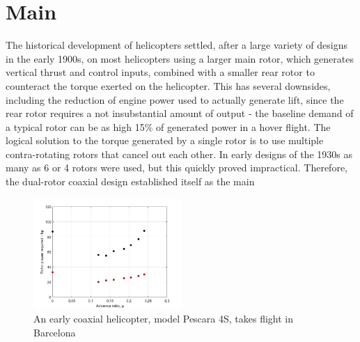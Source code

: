 \documentclass[11pt, a4paper]{scrartcl}
\begin{document}
\section{Main\label{Main}}
The historical development of helicopters settled, after a large variety of designs in the early 1900s, on most helicopters using a larger main rotor, which generates vertical thrust and control inputs, combined with a smaller rear rotor to counteract the torque exerted on the helicopter. This has several downsides, including the reduction of engine power used to actually generate lift, since the rear rotor requires a not insubstantial amount of output - the baseline demand of a typical rotor can be as high 15\% of generated power in a hover flight.\cite{dries-2003} The logical solution to the torque generated by a single rotor is to use multiple contra-rotating rotors that cancel out each other. In early designs of the 1930s as many as 6 or 4 rotors were used,\cite{Pescara-1930} but this quickly proved impractical. Therefore, the dual-rotor coaxial design established itself as the main 

\begin{figure}
    \includegraphics[width=0.5\textwidth]{Plot.jpg}
    \caption{An early coaxial helicopter, model Pescara 4S, takes flight in Barcelona}
\end{figure}
\vspace{1cm}

\printbibliography
\end{document}
